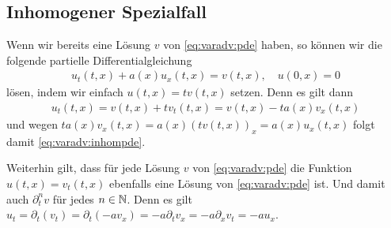 \subsection*{Inhomogener Spezialfall}

Wenn wir bereits eine Lösung $v$ von \eqref{eq:varadv:pde} haben, so können wir die folgende partielle Differentialgleichung
\begin{align}\label{eq:varadv:inhompde}
u_t(t,x) + a(x) u_x(t,x) = v(t,x), \quad u(0,x) = 0
\end{align}
lösen, indem wir einfach $u(t,x) = t v(t,x)$ setzen. Denn es gilt dann
\begin{align} u_t(t,x) = v(t,x) + t v_t(t,x) = v(t,x) - t a(x) v_x(t,x) \end{align}
und wegen $t a(x) v_x(t,x) = a(x) (t v(t,x))_x = a(x) u_x(t,x)$ folgt damit \eqref{eq:varadv:inhompde}.

Weiterhin gilt, dass für jede Lösung $v$ von \eqref{eq:varadv:pde} die Funktion $u(t,x) = v_t(t,x)$ ebenfalls eine Lösung von \eqref{eq:varadv:pde} ist.
Und damit auch $\partial^n_t v$ für jedes $n \in \mathbb N$.
Denn es gilt $u_t = \partial_t (v_t) = \partial_t(- a v_x) = - a \partial_t v_x = -a \partial_x v_t = -a u_x$.


